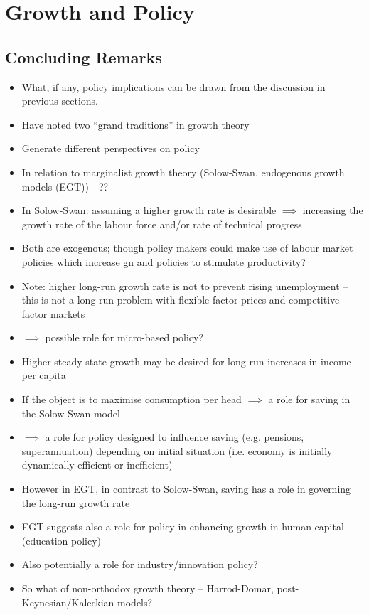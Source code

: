 \documentclass{article}
\begin{document}
\section{Growth and Policy}
\subsection{Concluding Remarks}
\begin{itemize}
	\item What, if any, policy implications can be drawn from the discussion in previous sections.
	\item Have noted two ``grand traditions'' in growth theory
	\item Generate different perspectives on policy
	\item In relation to marginalist growth theory (Solow-Swan, endogenous growth models (EGT)) - ??
	\item In Solow-Swan: assuming a higher growth rate is desirable \( \implies \) increasing the growth rate of the labour force and/or rate of technical progress
	\item Both are exogenous; though policy makers could make use of labour market policies which increase gn and policies to stimulate productivity?
	\item Note: higher long-run growth rate is not to prevent rising unemployment -- this is not a long-run problem with flexible factor prices and competitive factor markets
	\item \( \implies \) possible role for micro-based policy?
	\item Higher steady state growth may be desired for long-run increases in income per capita
	\item If the object is to maximise consumption per head \( \implies \) a role for saving in the Solow-Swan model
	\item \( \implies \) a role for policy designed to influence saving (e.g. pensions, superannuation) depending on initial situation (i.e. economy is initially dynamically efficient or inefficient)
	\item However in EGT, in contrast to Solow-Swan, saving has a role in governing the long-run growth rate
	\item EGT suggests also a role for policy in enhancing growth in human capital (education policy)
	\item Also potentially a role for industry/innovation policy?
	\item So what of non-orthodox growth theory -- Harrod-Domar, post-Keynesian/Kaleckian models?

\end{itemize}
\end{document}
